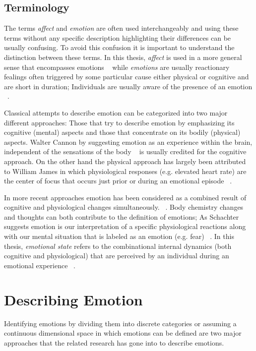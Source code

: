 \subsection{Terminology}

The terms \textit{affect} and \textit{emotion} are often used interchangeably and using these terms without any specific description highlighting their differences can be usually confusing. To avoid this confusion it is important to understand the distinction between these terms. In this thesis, \textit{affect} is used in a more general sense that encompasses emotions ~\cite{forgas1995mood} while \textit{emotions} are usually reactionary fealings often triggered by some particular cause either physical or cognitive and are short in duration; Individuals are usually aware of the presence of an emotion ~\cite{paiva2007affective}.

Classical attempts to describe emotion can be categorized into two major different approaches: Those that try to describe emotion by emphasizing its cognitive (mental) aspects and those that concentrate on its bodily (physical) aspects. Walter Cannon by suggesting emotion as an experience within the brain, independent of the sensations of the body ~\cite{cannon1927james} is usually credited for the cognitive approach. On the other hand the physical approach has largely been attributed to William James in which physiological responses (e.g. elevated heart rate) are the center of focus that occurs just prior or during an emotional episode ~\cite{paiva2007affective}.

In more recent approaches emotion has been considered as a combined result of cognitive and physiological changes simultaneously. ~\cite{paiva2007affective}. Body chemistry changes and thoughts can both contribute to the definition of emotions; As Schachter suggests emotion is our interpretation of a specific physiological reactions along with our mental situation that is labeled as an emotion (e.g. fear) ~\cite{schachter1964interaction}. In this thesis, \textit{emotional state} refers to the combinational internal dynamics (both cognitive and physiological) that are perceived by an individual during an emotional experience ~\cite{paiva2007affective}.

\section{Describing Emotion}

Identifying emotions by dividing them into discrete categories or assuming a continuous dimensional space in which emotions can be defined are two major approaches that the related research has gone into to describe emotions.

